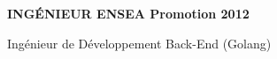 \documentclass[11pt,a4paper, final]{cv}
\begin{document}
\begin{center}
    \textbf{INGÉNIEUR ENSEA Promotion 2012}
    \vspace{3mm}
\end{center}

\begin{heading}


\end{heading}

\begin{objective}
    Ingénieur de Développement Back-End (Golang)
\end{objective}
\end{document}
